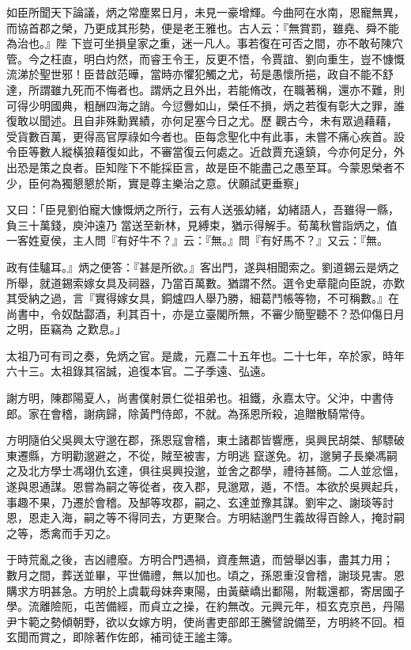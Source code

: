\begin{pinyinscope}
 如臣所聞天下論議，炳之常塵累日月，未見一豪增輝。今曲阿在水南，恩寵無異，而協首郡之榮，乃更成其形勢，便是老王雅也。古人云：『無賞罰，雖堯、舜不能為治也。』陛
 下豈可坐損皇家之重，迷一凡人。事若復在可否之間，亦不敢茍陳穴管。今之枉直，明白灼然，而睿王令王，反更不悟，令賈誼、劉向重生，豈不慷慨流涕於聖世邪！臣昔啟范曄，當時亦懼犯觸之尤，茍是愚懷所挹，政自不能不舒達，所謂雖九死而不悔者也。謂炳之且外出，若能脩改，在職著稱，還亦不難，則可得少明國典，粗酬四海之誚。今愆釁如山，榮任不損，炳之若復有彰大之罪，誰復敢以聞述。且自非殊勳異績，亦何足塞今日之尤。歷
 觀古今，未有眾過藉藉，受貨數百萬，更得高官厚祿如今者也。臣每念聖化中有此事，未嘗不痛心疾首。設令臣等數人縱橫狼藉復如此，不審當復云何處之。近啟賈充遠鎮，今亦何足分，外出恐是策之良者。臣知陛下不能採臣言，故是臣不能盡己之愚至耳。今蒙恩榮者不少，臣何為獨懇懇於斯，實是尊主樂治之意。伏願試更垂察」



 又曰：「臣見劉伯寵大慷慨炳之所行，云有人送張幼緒，幼緒語人，吾雖得一縣，負三十萬錢，庾沖遠乃
 當送至新林，見縛束，猶示得解手。荀萬秋嘗詣炳之，值一客姓夏侯，主人問『有好牛不？』云：『無。』問『有好馬不？』又云：『無。



 政有佳驢耳。』炳之便答：『甚是所欲。』客出門，遂與相聞索之。劉道錫云是炳之所舉，就道錫索嫁女具及祠器，乃當百萬數。猶謂不然。選令史章龍向臣說，亦歎其受納之過，言『實得嫁女具，銅爐四人舉乃勝，細葛鬥帳等物，不可稱數。』在尚書中，令奴酤酃酒，利其百十，亦是立臺閣所無，不審少簡聖聽不？恐仰傷日月之明，臣竊為
 之歎息。」



 太祖乃可有司之奏，免炳之官。是歲，元嘉二十五年也。二十七年，卒於家，時年六十三。太祖錄其宿誠，追復本官。二子季遠、弘遠。



 謝方明，陳郡陽夏人，尚書僕射景仁從祖弟也。祖鐵，永嘉太守。父沖，中書侍郎。家在會稽，謝病歸，除黃門侍郎，不就。為孫恩所殺，追贈散騎常侍。



 方明隨伯父吳興太守邈在郡，孫恩寇會稽，東土諸郡皆響應，吳興民胡桀、郜驃破東遷縣，方明勸邈避之，不從，賊至被害，方明逃
 竄遂免。初，邈舅子長樂馮嗣之及北方學士馮翊仇玄達，俱往吳興投邈，並舍之郡學，禮待甚簡。二人並忿慍，遂與恩通謀。恩嘗為嗣之等從者，夜入郡，見邈眾，遁，不悟。本欲於吳興起兵，事趣不果，乃遷於會稽。及郜等攻郡，嗣之、玄達並豫其謀。劉牢之、謝琰等討恩，恩走入海，嗣之等不得同去，方更聚合。方明結邈門生義故得百餘人，掩討嗣之等，悉禽而手刃之。



 于時荒亂之後，吉凶禮廢。方明合門遇禍，資產無遺，而營舉凶事，盡其力用；
 數月之間，葬送並畢，平世備禮，無以加也。頃之，孫恩重沒會稽，謝琰見害。恩購求方明甚急。方明於上虞載母妹奔東陽，由黃蘗嶠出鄱陽，附載還都，寄居國子學。流離險阨，屯苦備經，而貞立之操，在約無改。元興元年，桓玄克京邑，丹陽尹卞範之勢傾朝野，欲以女嫁方明，使尚書吏部郎王騰譬說備至，方明終不回。桓玄聞而賞之，即除著作佐郎，補司徒王謐主簿。




\end{pinyinscope}
